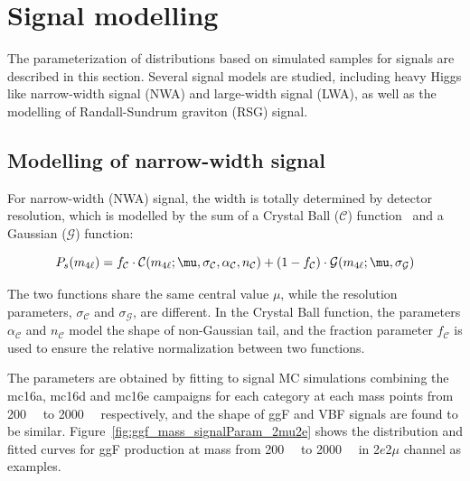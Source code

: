 \section{Signal modelling}
\label{sec:signal_model}

The parameterization of \mfl distributions based on simulated samples for signals are described in this section.
Several signal models are studied, including heavy Higgs like narrow-width signal (NWA) and large-width signal (LWA), as well as the modelling of Randall-Sundrum graviton (RSG) signal.


\subsection{Modelling of narrow-width signal}
\label{sec:signal_nwa}

For narrow-width (NWA) signal, the \mfl width is totally determined by detector resolution, which is modelled 
by the sum of a Crystal Ball ($\mathcal{C}$) function~\cite{CrystalBall1,CrystalBall2} and a Gaussian ($\mathcal{G}$) function:

\begin{equation}
    \label{eq:cb_plus_g}
    P_{s} (\mfl) = f_{\mathcal{C}} \cdot \mathcal{C}(\mfl; \mu, \sigma_{\mathcal{C}}, \alpha_{\mathcal{C}}, n_{\mathcal{C}})
                   + (1 - f_{\mathcal{C}}) \cdot \mathcal{G}(\mfl; \mu, \sigma_{\mathcal{G}})
\end{equation}

The two functions share the same central value $\mu$, while the resolution parameters, $\sigma_{\mathcal{C}}$ and $\sigma_{\mathcal{G}}$, are different.
In the Crystal Ball function, the parameters $\alpha_{\mathcal{C}}$ and $n_{\mathcal{C}}$ model the shape of non-Gaussian tail,
and the fraction parameter $f_{\mathcal{C}}$ is used to ensure the relative normalization between two functions.

The parameters are obtained by fitting to signal MC simulations combining the mc16a, mc16d and mc16e campaigns for each category at each mass points from 200~\gev~ to 2000~\gev~ respectively,
and the shape of ggF and VBF signals are found to be similar.
Figure~\ref{fig:ggf_mass_signalParam_2mu2e} shows the \mfl distribution and fitted curves for ggF production at mass from 200~\gev~ to 2000~\gev~ in 2$e$2$\mu$ channel as examples.

